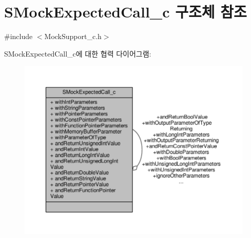 \hypertarget{struct_s_mock_expected_call__c}{}\section{S\+Mock\+Expected\+Call\+\_\+c 구조체 참조}
\label{struct_s_mock_expected_call__c}


{\ttfamily \#include $<$Mock\+Support\+\_\+c.\+h$>$}



S\+Mock\+Expected\+Call\+\_\+c에 대한 협력 다이어그램\+:
\nopagebreak
\begin{figure}[H]
\begin{center}
\leavevmode
\includegraphics[width=350pt]{struct_s_mock_expected_call__c__coll__graph}
\end{center}
\end{figure}
